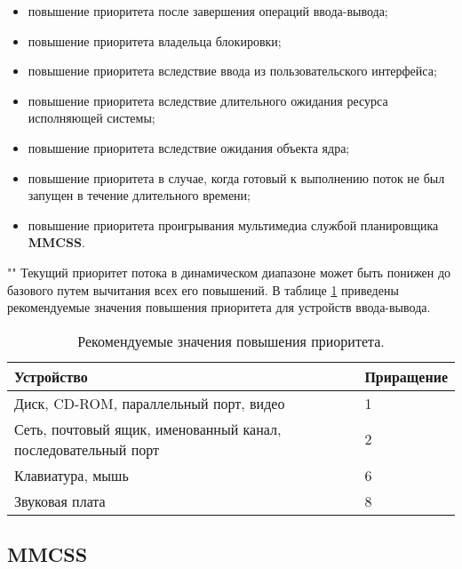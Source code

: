 \begin{itemize}
    \item повышение приоритета после завершения операций ввода-вывода;
    \item повышение приоритета владельца блокировки;
    \item повышение приоритета вследствие ввода из пользовательского интерфейса;
    \item повышение приоритета вследствие длительного ожидания ресурса исполняющей системы;
    \item повышение приоритета вследствие ожидания объекта ядра;
    \item повышение приоритета в случае, когда готовый к выполнению поток не был запущен в течение длительного времени;
    \item повышение приоритета проигрывания мультимедиа службой планировщика \textbf{MMCSS}.
\end{itemize}

""\newline 
\noindent Текущий приоритет потока в динамическом диапазоне может быть понижен до базового путем вычитания всех его повышений. В таблице \ref{tab:io} приведены рекомендуемые значения повышения приоритета для устройств ввода-вывода.

\begin{table}[h!]
    \caption{Рекомендуемые значения повышения приоритета.}
    \begin{center}
        \begin{tabular}{|p{100mm}|l|}
            \hline
            \textbf{Устройство} & \textbf{Приращение} \\
            \hline
            Диск, CD-ROM, параллельный порт, видео & 1 \\
            \hline
            Сеть, почтовый ящик, именованный канал, последовательный порт & 2 \\
            \hline
            Клавиатура, мышь & 6 \\
            \hline
            Звуковая плата & 8 \\
            \hline
        \end{tabular}
    \end{center}
    \label{tab:io}
\end{table}

\subsection{MMCSS}


